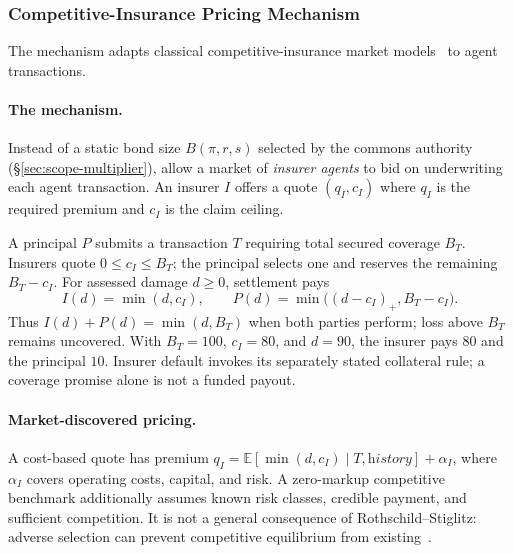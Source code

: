 \documentclass[11pt,a4paper]{article}
\theoremstyle{definition}
\theoremstyle{remark}
\begin{document}
\subsubsection{Competitive-Insurance Pricing Mechanism}\label{sec:youle}
The mechanism adapts classical competitive-insurance market
models~ to agent transactions.

\paragraph{The mechanism.}\label{sec:youle:mechanism}
Instead of a static bond size $B(\pi, r, s)$ selected by the commons authority (\S\ref{sec:scope-multiplier}), allow a market of \emph{insurer agents} to bid on underwriting each agent transaction. An insurer $I$ offers a quote $(q_I, c_I)$ where $q_I$ is the required premium and $c_I$ is the claim ceiling.

A principal $P$ submits a transaction $T$ requiring total secured coverage
$B_T$. Insurers quote $0\le c_I\le B_T$; the principal selects one and
reserves the remaining $B_T-c_I$. For assessed damage $d\ge0$, settlement pays
\[
 I(d)=\min(d,c_I),\qquad
 P(d)=\min\bigl((d-c_I)_+,B_T-c_I\bigr).
\]
Thus $I(d)+P(d)=\min(d,B_T)$ when both parties perform; loss above $B_T$
remains uncovered. With $B_T=100$, $c_I=80$, and $d=90$, the insurer pays
$80$ and the principal $10$. Insurer default invokes its separately stated
collateral rule; a coverage promise alone is not a funded payout.

\paragraph{Market-discovered pricing.}
A cost-based quote has premium
$q_I=\mathbb E[\min(d,c_I)\mid T,\textit{history}]+\alpha_I$,
where $\alpha_I$ covers operating costs, capital, and risk. A zero-markup
competitive benchmark additionally assumes known risk classes, credible
payment, and sufficient competition. It is not a general consequence of
Rothschild--Stiglitz: adverse selection can prevent competitive equilibrium
from existing~.
\end{document}
